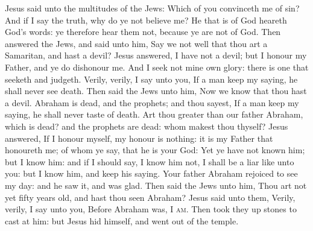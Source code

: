 
 Jesus said unto the multitudes of the Jews: Which of you convinceth me of sin? And if I say the truth, why do ye not believe me? He that is of God heareth God's words: ye therefore hear them not, because ye are not of God. Then answered the Jews, and said unto him, Say we not well that thou art a Samaritan, and hast a devil? Jesus answered, I have not a devil; but I honour my Father, and ye do dishonour me. And I seek not mine own glory: there is one that seeketh and judgeth. Verily, verily, I say unto you, If a man keep my saying, he shall never see death. Then said the Jews unto him, Now we know that thou hast a devil. Abraham is dead, and the prophets; and thou sayest, If a man keep my saying, he shall never taste of death. Art thou greater than our father Abraham, which is dead? and the prophets are dead: whom makest thou thyself? Jesus answered, If I honour myself, my honour is nothing: it is my Father that honoureth me; of whom ye say, that he is your God: Yet ye have not known him; but I know him: and if I should say, I know him not, I shall be a liar like unto you: but I know him, and keep his saying. Your father Abraham rejoiced to see my day: and he saw it, and was glad. Then said the Jews unto him, Thou art not yet fifty years old, and hast thou seen Abraham? Jesus said unto them, Verily, verily, I say unto you, Before Abraham was, \textsc{I am}. Then took they up stones to cast at him: but Jesus hid himself, and went out of the temple.

